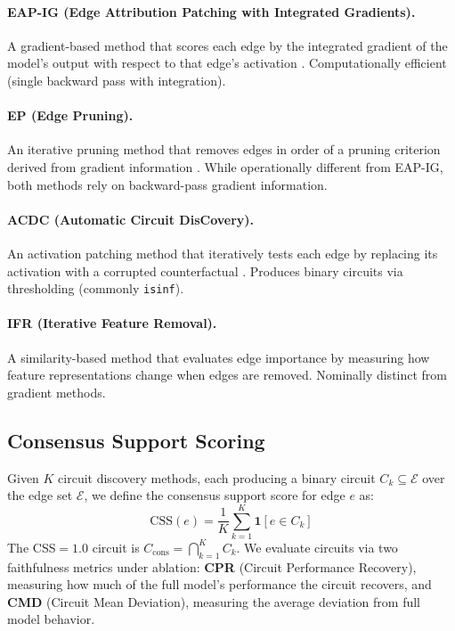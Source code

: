 \documentclass[11pt]{article}
\begin{document}
\paragraph{EAP-IG (Edge Attribution Patching with Integrated Gradients).} A gradient-based method that scores each edge by the integrated gradient of the model's output with respect to that edge's activation \citep{syed2023attribution}. Computationally efficient (single backward pass with integration).

\paragraph{EP (Edge Pruning).} An iterative pruning method that removes edges in order of a pruning criterion derived from gradient information \citep{li2024edge}. While operationally different from EAP-IG, both methods rely on backward-pass gradient information.

\paragraph{ACDC (Automatic Circuit DisCovery).} An activation patching method that iteratively tests each edge by replacing its activation with a corrupted counterfactual \citep{conmy2023towards}. Produces binary circuits via thresholding (commonly \texttt{isinf}).

\paragraph{IFR (Iterative Feature Removal).} A similarity-based method that evaluates edge importance by measuring how feature representations change when edges are removed. Nominally distinct from gradient methods.

\subsection{Consensus Support Scoring}

Given $K$ circuit discovery methods, each producing a binary circuit $C_k \subseteq \mathcal{E}$ over the edge set $\mathcal{E}$, we define the consensus support score for edge $e$ as:
\begin{equation}
    \text{CSS}(e) = \frac{1}{K} \sum_{k=1}^{K} \mathbf{1}[e \in C_k]
\end{equation}
The CSS$=1.0$ circuit is $C_{\text{cons}} = \bigcap_{k=1}^{K} C_k$. We evaluate circuits via two faithfulness metrics under ablation: \textbf{CPR} (Circuit Performance Recovery), measuring how much of the full model's performance the circuit recovers, and \textbf{CMD} (Circuit Mean Deviation), measuring the average deviation from full model behavior.
\end{document}
